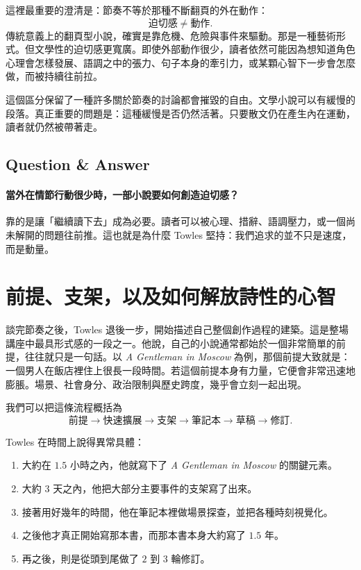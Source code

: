 這裡最重要的澄清是：節奏不等於那種不斷翻頁的外在動作：
\begin{equation}
\text{迫切感} \neq \text{動作}.
\end{equation}
傳統意義上的翻頁型小說，確實是靠危機、危險與事件來驅動。那是一種藝術形式。但文學性的迫切感更寬廣。即使外部動作很少，讀者依然可能因為想知道角色心理會怎樣發展、語調之中的張力、句子本身的牽引力，或某顆心智下一步會怎麼做，而被持續往前拉。

這個區分保留了一種許多關於節奏的討論都會摧毀的自由。文學小說可以有緩慢的段落。真正重要的問題是：這種緩慢是否仍然活著。只要散文仍在產生內在運動，讀者就仍然被帶著走。

\subsection{Question \& Answer}

\paragraph{當外在情節行動很少時，一部小說要如何創造迫切感？}

靠的是讓「繼續讀下去」成為必要。讀者可以被心理、措辭、語調壓力，或一個尚未解開的問題往前推。這也就是為什麼 Towles 堅持：我們追求的並不只是速度，而是動量。

\section{前提、支架，以及如何解放詩性的心智}

談完節奏之後，Towles 退後一步，開始描述自己整個創作過程的建築。這是整場講座中最具形式感的一段之一。他說，自己的小說通常都始於一個非常簡單的前提，往往就只是一句話。以 \emph{A Gentleman in Moscow} 為例，那個前提大致就是：一個男人在飯店裡住上很長一段時間。若這個前提本身有力量，它便會非常迅速地膨脹。場景、社會身分、政治限制與歷史跨度，幾乎會立刻一起出現。

我們可以把這條流程概括為
\begin{equation}
\text{前提} \longrightarrow \text{快速擴展} \longrightarrow \text{支架} \longrightarrow \text{筆記本} \longrightarrow \text{草稿} \longrightarrow \text{修訂}.
\end{equation}

Towles 在時間上說得異常具體：
\begin{enumerate}
\item 大約在 \(1.5\) 小時之內，他就寫下了 \emph{A Gentleman in Moscow} 的關鍵元素。
\item 大約 \(3\) 天之內，他把大部分主要事件的支架寫了出來。
\item 接著用好幾年的時間，他在筆記本裡做場景探查，並把各種時刻視覺化。
\item 之後他才真正開始寫那本書，而那本書本身大約寫了 \(1.5\) 年。
\item 再之後，則是從頭到尾做了 \(2\) 到 \(3\) 輪修訂。
\end{enumerate}

